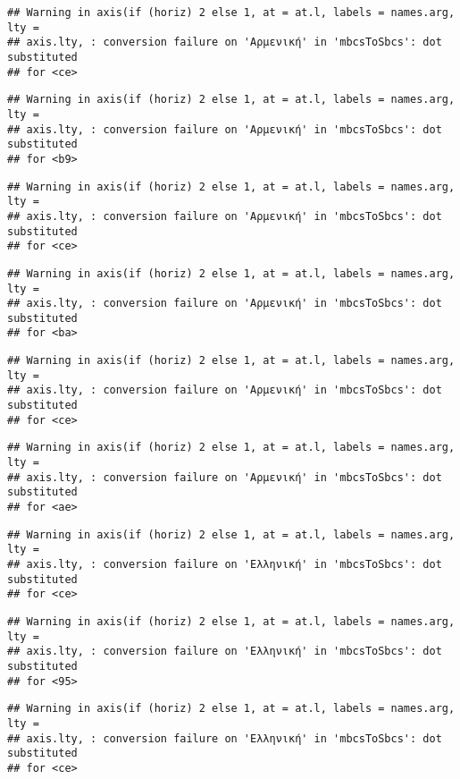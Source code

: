 \documentclass[
]{article}
\begin{document}
\begin{verbatim}
## Warning in axis(if (horiz) 2 else 1, at = at.l, labels = names.arg, lty =
## axis.lty, : conversion failure on 'Αρμενική' in 'mbcsToSbcs': dot substituted
## for <ce>
\end{verbatim}

\begin{verbatim}
## Warning in axis(if (horiz) 2 else 1, at = at.l, labels = names.arg, lty =
## axis.lty, : conversion failure on 'Αρμενική' in 'mbcsToSbcs': dot substituted
## for <b9>
\end{verbatim}

\begin{verbatim}
## Warning in axis(if (horiz) 2 else 1, at = at.l, labels = names.arg, lty =
## axis.lty, : conversion failure on 'Αρμενική' in 'mbcsToSbcs': dot substituted
## for <ce>
\end{verbatim}

\begin{verbatim}
## Warning in axis(if (horiz) 2 else 1, at = at.l, labels = names.arg, lty =
## axis.lty, : conversion failure on 'Αρμενική' in 'mbcsToSbcs': dot substituted
## for <ba>
\end{verbatim}

\begin{verbatim}
## Warning in axis(if (horiz) 2 else 1, at = at.l, labels = names.arg, lty =
## axis.lty, : conversion failure on 'Αρμενική' in 'mbcsToSbcs': dot substituted
## for <ce>
\end{verbatim}

\begin{verbatim}
## Warning in axis(if (horiz) 2 else 1, at = at.l, labels = names.arg, lty =
## axis.lty, : conversion failure on 'Αρμενική' in 'mbcsToSbcs': dot substituted
## for <ae>
\end{verbatim}

\begin{verbatim}
## Warning in axis(if (horiz) 2 else 1, at = at.l, labels = names.arg, lty =
## axis.lty, : conversion failure on 'Ελληνική' in 'mbcsToSbcs': dot substituted
## for <ce>
\end{verbatim}

\begin{verbatim}
## Warning in axis(if (horiz) 2 else 1, at = at.l, labels = names.arg, lty =
## axis.lty, : conversion failure on 'Ελληνική' in 'mbcsToSbcs': dot substituted
## for <95>
\end{verbatim}

\begin{verbatim}
## Warning in axis(if (horiz) 2 else 1, at = at.l, labels = names.arg, lty =
## axis.lty, : conversion failure on 'Ελληνική' in 'mbcsToSbcs': dot substituted
## for <ce>
\end{verbatim}
\end{document}
